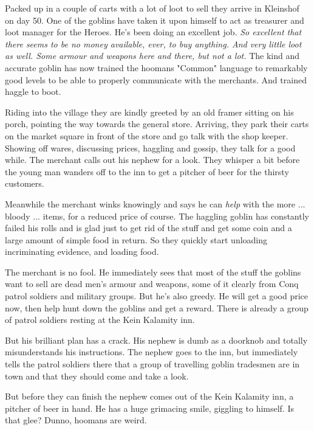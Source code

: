 Packed up in a couple of carts with a lot of loot to sell they arrive in Kleinshof on day 50. One of the goblins have taken it upon himself to act as treasurer and loot manager for the Heroes. He's been doing an excellent job. \emph{So excellent that there seems to be no money available, ever, to buy anything. And very little loot as well. Some armour and weapons here and there, but not a lot.} The kind and accurate goblin has now trained the hoomans "Common" language to remarkably good levels to be able to properly communicate with the merchants. And trained haggle to boot.

Riding into the village they are kindly greeted by an old framer sitting on his porch, pointing the way towards the general store. Arriving, they park their carts on the market square in front of the store and go talk with the shop keeper. Showing off wares, discussing prices, haggling and gossip, they talk for a good while. The merchant calls out his nephew for a look. They whisper a bit before the young man wanders off to the inn to get a pitcher of beer for the thirsty customers.

Meanwhile the merchant winks knowingly and says he can \emph{help} with the more ... bloody ... items, for a reduced price of course. The haggling goblin has constantly failed his rolls and is glad just to get rid of the stuff and get some coin and a large amount of simple food in return. So they quickly start unloading incriminating evidence, and loading food.

\begin{readoutloud}
The merchant is no fool. He immediately sees that most of the stuff the goblins want to sell are dead men's armour and weapons, some of it clearly from Conq patrol soldiers and military groups. But he's also greedy. He will get a good price now, then help hunt down the goblins and get a reward. There is already a group of patrol soldiers resting at the Kein Kalamity inn.

But his brilliant plan has a crack. His nephew is dumb as a doorknob and totally misunderstands his instructions. The nephew goes to the inn, but immediately tells the patrol soldiers there that a group of travelling goblin tradesmen are in town and that they should come and take a look.
\end{readoutloud}

\noindent But before they can finish the nephew comes out of the Kein Kalamity inn, a pitcher of beer in hand. He has a huge grimacing smile, giggling to himself. Is that glee? Dunno, hoomans are weird.

